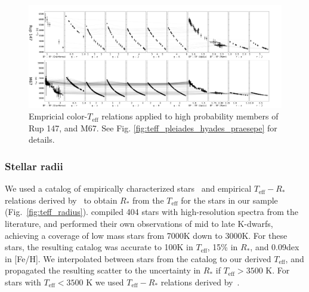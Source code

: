\documentclass{aa}
\begin{document}
   \begin{figure}[ht!]
		\centering
           \includegraphics[angle=90, width=0.52\hsize]{pics/clusters/Teff_spread_old.png}

      \caption{Empricial color-$T_\mathrm{eff}$ relations applied to high probability members of Rup 147, and M67. See Fig. \ref{fig:teff_pleiades_hyades_praesepe} for details.}
         \label{fig:teff_ngc6774_ngc2682}
   \end{figure}   


\subsubsection{Stellar radii}

We used a catalog of empirically characterized stars~\citep{yee_specmatch_2017} and empirical $T_\mathrm{eff}-R_*$ relations derived by~\citet{mann_how_2015,mann_erratum_2016} to obtain $R_*$ from the $T_\mathrm{eff}$ for the stars in our sample (Fig.~\ref{fig:teff_radius}). \citet{yee_specmatch_2017} compiled 404 stars with high-resolution spectra from the literature, and performed their own observations of mid to late K-dwarfs, achieving a coverage of low mass stars from 7000\;K down to 3000\;K. For these stars, the resulting catalog was accurate to 100\;K in
$T_\mathrm{eff}$, 15\;\% in $R_*$, and 0.09\;dex in [Fe/H]. We interpolated between stars from the catalog to our derived $T_\mathrm{eff}$,  and propagated the resulting scatter to the uncertainty in $R_*$ if $T_\mathrm{eff}>3500$ K. For stars with \mbox{$T_\mathrm{eff}< 3500$} K we used $T_\mathrm{eff}-R_*$ relations derived by~\citet{mann_how_2015,mann_erratum_2016}. 
\end{document}
